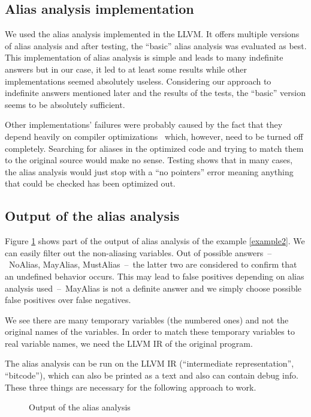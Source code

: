\subsection{Alias analysis implementation}
We used the alias analysis implemented in the LLVM. It offers multiple versions of alias analysis and after testing, the ``basic'' alias analysis was evaluated as best. This implementation of alias analysis is simple and leads to many indefinite answers but in our case, it led to at least some results while other implementations seemed absolutely useless. Considering our approach to indefinite answers mentioned later and the results of the tests, the ``basic'' version seems to be absolutely sufficient.

Other implementations' failures were probably caused by the fact that they depend heavily on compiler optimizations~\cite{alias-analysis-optimizations} which, however, need to be turned off completely. Searching for aliases in the optimized code and trying to match them to the original source would make no sense. Testing shows that in many cases, the alias analysis would just stop with a ``no pointers'' error meaning anything that could be checked has been optimized out.

\subsection{Output of the alias analysis}
Figure \ref{alias-output} shows part of the output of alias analysis of the example \ref{example2}. We can easily filter out the non-aliasing variables. Out of possible answers~--~NoAlias, MayAlias, MustAlias~--~the latter two are considered to confirm that an undefined behavior occurs. This may lead to false positives depending on alias analysis used~--~MayAlias is not a definite answer and we simply choose possible false positives over false negatives.

We see there are many temporary variables (the numbered ones) and not the original names of the variables. In order to match these temporary variables to real variable names, we need the LLVM IR of the original program.

The alias analysis can be run on the LLVM IR (``intermediate representation'', ``bitcode''), which can also be printed as a text and also can contain debug info. These three things are necessary for the following approach to work.
\begin{figure}
\caption{Output of the alias analysis}
\label{alias-output}
\end{figure}

